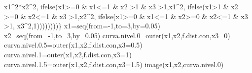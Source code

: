 \documentclass[
  letterpaper,
  DIV=11,
  numbers=noendperiod]{scrreprt}
\newenvironment{Shaded}{\begin{snugshade}}{\end{snugshade}}
\newcommand{\AttributeTok}[1]{\textcolor[rgb]{0.40,0.45,0.13}{#1}}
\newcommand{\DecValTok}[1]{\textcolor[rgb]{0.68,0.00,0.00}{#1}}
\newcommand{\FloatTok}[1]{\textcolor[rgb]{0.68,0.00,0.00}{#1}}
\newcommand{\FunctionTok}[1]{\textcolor[rgb]{0.28,0.35,0.67}{#1}}
\newcommand{\NormalTok}[1]{\textcolor[rgb]{0.00,0.23,0.31}{#1}}
\newcommand{\OtherTok}[1]{\textcolor[rgb]{0.00,0.23,0.31}{#1}}
\newcommand{\SpecialCharTok}[1]{\textcolor[rgb]{0.37,0.37,0.37}{#1}}
\begin{document}
\begin{Shaded}
\begin{Highlighting}[]
\NormalTok{                 x1}\SpecialCharTok{\^{}}\DecValTok{2}\SpecialCharTok{*}\NormalTok{x2}\SpecialCharTok{\^{}}\DecValTok{2}\NormalTok{,}
          \FunctionTok{ifelse}\NormalTok{(x1}\SpecialCharTok{\textgreater{}=}\DecValTok{0} \SpecialCharTok{\&}\NormalTok{ x1}\SpecialCharTok{\textless{}=}\DecValTok{1} \SpecialCharTok{\&}\NormalTok{ x2 }\SpecialCharTok{\textgreater{}}\DecValTok{1} \SpecialCharTok{\&}\NormalTok{ x3 }\SpecialCharTok{\textgreater{}}\DecValTok{1}\NormalTok{,x1}\SpecialCharTok{\^{}}\DecValTok{2}\NormalTok{,}
          \FunctionTok{ifelse}\NormalTok{(x1}\SpecialCharTok{\textgreater{}}\DecValTok{1} \SpecialCharTok{\&}\NormalTok{ x2 }\SpecialCharTok{\textgreater{}=}\DecValTok{0} \SpecialCharTok{\&}\NormalTok{ x2}\SpecialCharTok{\textless{}=}\DecValTok{1} \SpecialCharTok{\&}\NormalTok{ x3 }\SpecialCharTok{\textgreater{}}\DecValTok{1}\NormalTok{,x2}\SpecialCharTok{\^{}}\DecValTok{2}\NormalTok{,}
          \FunctionTok{ifelse}\NormalTok{(x1}\SpecialCharTok{\textgreater{}=}\DecValTok{0} \SpecialCharTok{\&}\NormalTok{ x1}\SpecialCharTok{\textless{}=}\DecValTok{1} \SpecialCharTok{\&}\NormalTok{ x2}\SpecialCharTok{\textgreater{}=}\DecValTok{0} \SpecialCharTok{\&}\NormalTok{ x2}\SpecialCharTok{\textless{}=}\DecValTok{1} \SpecialCharTok{\&}\NormalTok{ x3 }\SpecialCharTok{\textgreater{}}\DecValTok{1}\NormalTok{,}
\NormalTok{                 x3}\SpecialCharTok{\^{}}\DecValTok{2}\NormalTok{,}\DecValTok{1}\NormalTok{))))))))\}}
\NormalTok{x1}\OtherTok{=}\FunctionTok{seq}\NormalTok{(}\AttributeTok{from=}\SpecialCharTok{{-}}\DecValTok{1}\NormalTok{,}\AttributeTok{to=}\DecValTok{3}\NormalTok{,}\AttributeTok{by=}\FloatTok{0.05}\NormalTok{)}
\NormalTok{x2}\OtherTok{=}\FunctionTok{seq}\NormalTok{(}\AttributeTok{from=}\SpecialCharTok{{-}}\DecValTok{1}\NormalTok{,}\AttributeTok{to=}\DecValTok{3}\NormalTok{,}\AttributeTok{by=}\FloatTok{0.05}\NormalTok{)}
\NormalTok{curva.nivel}\FloatTok{.0}\OtherTok{=}\FunctionTok{outer}\NormalTok{(x1,x2,f.dist.con,}\AttributeTok{x3=}\DecValTok{0}\NormalTok{)}
\NormalTok{curva.nivel.}\FloatTok{0.5}\OtherTok{=}\FunctionTok{outer}\NormalTok{(x1,x2,f.dist.con,}\AttributeTok{x3=}\FloatTok{0.5}\NormalTok{)}
\NormalTok{curva.nivel}\FloatTok{.1}\OtherTok{=}\FunctionTok{outer}\NormalTok{(x1,x2,f.dist.con,}\AttributeTok{x3=}\DecValTok{1}\NormalTok{)}
\NormalTok{curva.nivel.}\FloatTok{1.5}\OtherTok{=}\FunctionTok{outer}\NormalTok{(x1,x2,f.dist.con,}\AttributeTok{x3=}\FloatTok{1.5}\NormalTok{)}
\FunctionTok{image}\NormalTok{(x1,x2,curva.nivel}\FloatTok{.0}\NormalTok{)}
\end{Highlighting}
\end{Shaded}
\end{document}

